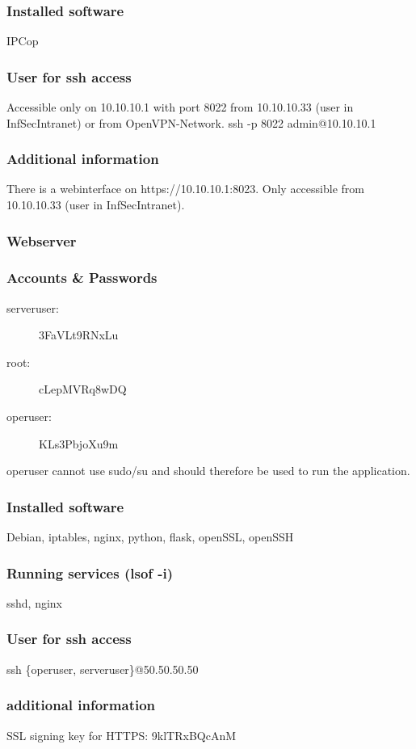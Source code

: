 \documentclass[a4paper, toc=index, 12pt, DIV14, twoside, BCOR2cm, headsepline, numbers=noenddot, bibliography=totoc]{report}
\begin{document}
\subsubsection*{Installed software}
IPCop
\subsubsection*{User for ssh access}
Accessible only on 10.10.10.1 with port 8022 from 10.10.10.33 (user in InfSecIntranet) or from OpenVPN-Network.\newline
ssh -p 8022 admin@10.10.10.1
\subsubsection*{Additional information}
There is a webinterface on https://10.10.10.1:8023. Only accessible from 10.10.10.33 (user in InfSecIntranet).

\subsubsection{Webserver}
\subsubsection*{Accounts \& Passwords}
\begin{multicols}{2}
\begin{description}
\item[serveruser:] 3FaVLt9RNxLu
\item[root:] cLepMVRq8wDQ
\item[operuser:] KLs3PbjoXu9m
\end{description}
\end{multicols}
operuser cannot use sudo/su and should therefore be used to run the application.
\subsubsection*{Installed software}
Debian, iptables, nginx, python, flask, openSSL, openSSH
\subsubsection*{Running services (lsof -i)}
sshd, nginx
\subsubsection*{User for ssh access}
ssh \{operuser, serveruser\}@50.50.50.50
\subsubsection*{additional information}
SSL signing key for HTTPS: 9klTRxBQcAnM
\end{document}

